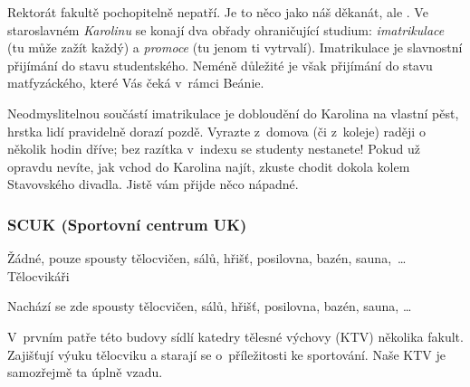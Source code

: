 Rektorát fakultě pochopitelně nepatří. Je to něco jako náš
děkanát, ale .  Ve staroslavném {\it Karolinu\/}
se konají dva obřady ohraničující studium: {\it imatrikulace\/}
(tu může zažít každý) a {\it promoce\/} (tu jenom ti vytrvalí).
Imatrikulace je slavnostní přijímání do stavu studentského. Neméně
důležité je však přijímání do stavu matfyzáckého, které Vás čeká
v~rámci Beánie. 

Neodmyslitelnou součástí imatrikulace je
dobloudění do Karolina na vlastní pěst, hrstka lidí pravidelně
dorazí pozdě. Vyrazte z~domova (či z~koleje) raději o několik
hodin dříve; bez razítka  v~indexu se
studenty nestanete! Pokud už opravdu nevíte, jak vchod do Karolina
najít, zkuste chodit dokola kolem Stavovského divadla. Jistě vám
přijde něco nápadné.

\subsubsection{SCUK (Sportovní centrum UK)}

 {Žádné, pouze spousty tělocvičen, sálů, hřišť,
posilovna, bazén, sau\-na,~\dots}{Tělocvikáři}


Nachází se zde spousty tělocvičen, sálů, hřišť, posilovna, bazén, sauna, \dots

V~prvním patře této budovy sídlí katedry tělesné výchovy (KTV)
několika fakult. Zajišťují výuku tělocviku a starají se
o~příležitosti ke sportování. Naše KTV je samozřejmě ta úplně
vzadu.

